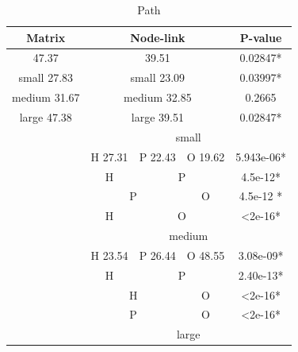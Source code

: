 \documentclass{l4proj}
\begin{document}
\begin{table}[H]
\centering
\caption{Path}
\label{my-label}
\begin{tabular}{|c|c|c|c|c|c|c|}
\hline
\multicolumn{3}{|c|}{\textbf{Matrix}}     & \multicolumn{3}{c|}{\textbf{Node-link}} & \textbf{P-value} \\ \hline
\multicolumn{3}{|c|}{47.37}               & \multicolumn{3}{c|}{39.51}              & 0.02847*         \\ \hline
\multicolumn{3}{|c|}{small 27.83}         & \multicolumn{3}{c|}{small 23.09}        & 0.03997*         \\ \hline
\multicolumn{3}{|c|}{medium 31.67}        & \multicolumn{3}{c|}{medium 32.85}       & 0.2665           \\ \hline
\multicolumn{3}{|c|}{large 47.38}         & \multicolumn{3}{c|}{large 39.51}        & 0.02847*         \\ \hline
\multicolumn{3}{|c|}{\multirow{15}{*}{}}  & \multicolumn{4}{c|}{small}                                 \\ \cline{4-7} 
\multicolumn{3}{|c|}{}                    & H 27.31      & P 22.43     & O 19.62    & 5.943e-06*       \\ \cline{4-7} 
\multicolumn{3}{|c|}{}                    & H            & \multicolumn{2}{c|}{P}   & 4.5e-12*         \\ \cline{4-7} 
\multicolumn{3}{|c|}{}                    & \multicolumn{2}{c|}{P}     & O          & 4.5e-12 *        \\ \cline{4-7} 
\multicolumn{3}{|c|}{}                    & H            & \multicolumn{2}{c|}{O}   & \textless 2e-16* \\ \cline{4-7} 
\multicolumn{3}{|c|}{}                    & \multicolumn{4}{c|}{medium}                                \\ \cline{4-7} 
\multicolumn{3}{|c|}{}                    & H 23.54      & P 26.44     & O 48.55    & 3.08e-09*        \\ \cline{4-7} 
\multicolumn{3}{|c|}{}                    & H            & \multicolumn{2}{c|}{P}   & 2.40e-13*        \\ \cline{4-7} 
\multicolumn{3}{|c|}{}                    & \multicolumn{2}{c|}{H}     & O          & \textless 2e-16* \\ \cline{4-7} 
\multicolumn{3}{|c|}{}                    & \multicolumn{2}{c|}{P}     & O          & \textless 2e-16* \\ \cline{4-7} 
\multicolumn{3}{|c|}{}                    & \multicolumn{4}{c|}{large}                                 \\ \cline{4-7} 

\end{tabular}
\end{table}
\end{document}
